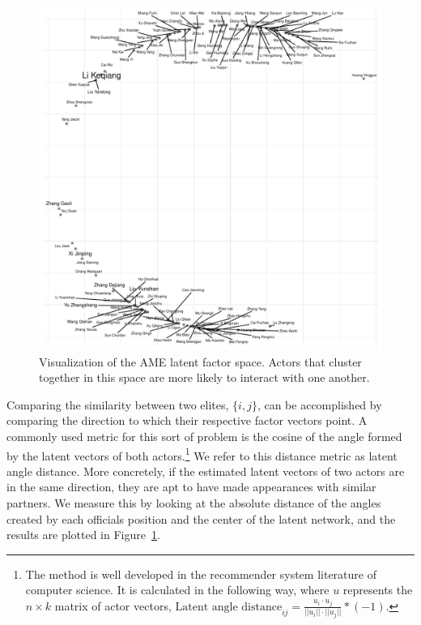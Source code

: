 \documentclass[11pt,english]{article}
\begin{document}
\begin{flushleft}
\noindent \begin{center}
\begin{figure}[H]
\noindent \begin{centering}
\includegraphics[width=5in]{figure/uViz}
\par\end{centering}
\caption{Visualization of the AME latent factor space. Actors that cluster together in this space are more likely
to interact with one another.}
\label{fig:uv}
\end{figure}
\par\end{center}

Comparing the similarity between two elites, $\{i,j\}$, can be accomplished by comparing the direction to which their respective factor vectors point. A commonly used metric for this sort of problem is the cosine of the angle formed by the latent vectors of both actors.\footnote{The method is well developed in the recommender system literature of computer science. It is calculated in the following way, where $u$ represents the $n\times k$ matrix of actor vectors, $\text{Latent angle distance}_{ij}=\frac{u_{i}\cdot u_{j}}{||u_{i}||\cdot||u_{j}||}*(-1)$. } We refer to this distance metric as latent angle distance. More concretely, if the estimated latent vectors of two actors are in the same direction, they are apt to have made appearances with similar partners. We measure this by looking at the absolute distance of the angles created by each officials position and the center of the latent network, and the results are plotted in Figure~\ref{fig:uv}.


\end{flushleft}
\end{document}
